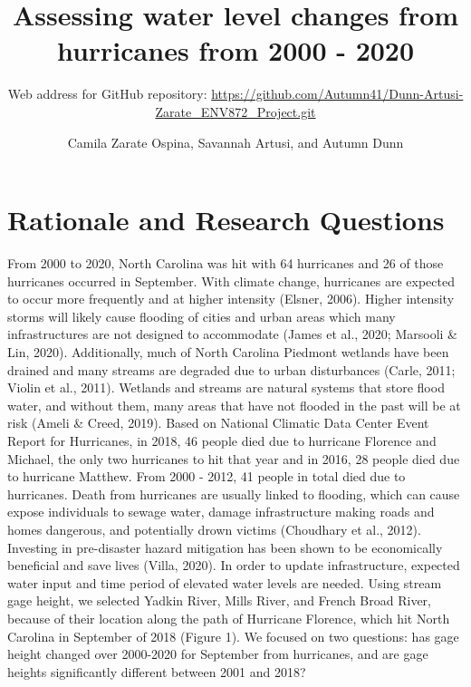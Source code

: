 \documentclass[
  12pt,
]{article}
\title{Assessing water level changes from hurricanes from 2000 - 2020}
\subtitle{Web address for GitHub repository:
\url{https://github.com/Autumn41/Dunn-Artusi-Zarate_ENV872_Project.git}}
\author{Camila Zarate Ospina, Savannah Artusi, and Autumn Dunn}
\date{}
\begin{document}
\maketitle

\newpage
\tableofcontents 
\newpage
\listoftables 
\newpage
\listoffigures 
\newpage

\hypertarget{rationale-and-research-questions}{%
\section{Rationale and Research
Questions}\label{rationale-and-research-questions}}

From 2000 to 2020, North Carolina was hit with 64 hurricanes and 26 of
those hurricanes occurred in September. With climate change, hurricanes
are expected to occur more frequently and at higher intensity (Elsner,
2006). Higher intensity storms will likely cause flooding of cities and
urban areas which many infrastructures are not designed to accommodate
(James et al., 2020; Marsooli \& Lin, 2020). Additionally, much of North
Carolina Piedmont wetlands have been drained and many streams are
degraded due to urban disturbances (Carle, 2011; Violin et al., 2011).
Wetlands and streams are natural systems that store flood water, and
without them, many areas that have not flooded in the past will be at
risk (Ameli \& Creed, 2019). Based on National Climatic Data Center
Event Report for Hurricanes, in 2018, 46 people died due to hurricane
Florence and Michael, the only two hurricanes to hit that year and in
2016, 28 people died due to hurricane Matthew. From 2000 - 2012, 41
people in total died due to hurricanes. Death from hurricanes are
usually linked to flooding, which can cause expose individuals to sewage
water, damage infrastructure making roads and homes dangerous, and
potentially drown victims (Choudhary et al., 2012). Investing in
pre-disaster hazard mitigation has been shown to be economically
beneficial and save lives (Villa, 2020). In order to update
infrastructure, expected water input and time period of elevated water
levels are needed. Using stream gage height, we selected Yadkin River,
Mills River, and French Broad River, because of their location along the
path of Hurricane Florence, which hit North Carolina in September of
2018 (Figure 1). We focused on two questions: has gage height changed
over 2000-2020 for September from hurricanes, and are gage heights
significantly different between 2001 and 2018?
\end{document}
